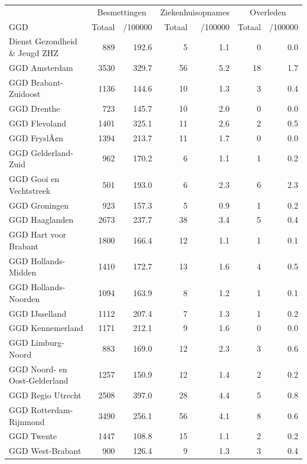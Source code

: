 \documentclass[
  english,
  man,floatsintext]{apa6}
\begin{document}
\begin{table}
\centering\begingroup\fontsize{10}{12}\selectfont

\begin{threeparttable}
\begin{tabular}{lrrrrrr}
\toprule
\multicolumn{1}{c}{ } & \multicolumn{2}{c}{Besmettingen} & \multicolumn{2}{c}{Ziekenhuisopnames} & \multicolumn{2}{c}{Overleden} \\
\cmidrule(l{3pt}r{3pt}){2-3} \cmidrule(l{3pt}r{3pt}){4-5} \cmidrule(l{3pt}r{3pt}){6-7}
GGD & Totaal & /100000 & Totaal & /100000 & Totaal & /100000\\
\midrule
Dienst Gezondheid \& Jeugd ZHZ & 889 & 192.6 & 5 & 1.1 & 0 & 0.0\\
GGD Amsterdam & 3530 & 329.7 & 56 & 5.2 & 18 & 1.7\\
GGD Brabant-Zuidoost & 1136 & 144.6 & 10 & 1.3 & 3 & 0.4\\
GGD Drenthe & 723 & 145.7 & 10 & 2.0 & 0 & 0.0\\
GGD Flevoland & 1401 & 325.1 & 11 & 2.6 & 2 & 0.5\\
GGD FryslÃ¢n & 1394 & 213.7 & 11 & 1.7 & 0 & 0.0\\
GGD Gelderland-Zuid & 962 & 170.2 & 6 & 1.1 & 1 & 0.2\\
GGD Gooi en Vechtstreek & 501 & 193.0 & 6 & 2.3 & 6 & 2.3\\
GGD Groningen & 923 & 157.3 & 5 & 0.9 & 1 & 0.2\\
GGD Haaglanden & 2673 & 237.7 & 38 & 3.4 & 5 & 0.4\\
GGD Hart voor Brabant & 1800 & 166.4 & 12 & 1.1 & 1 & 0.1\\
GGD Hollands-Midden & 1410 & 172.7 & 13 & 1.6 & 4 & 0.5\\
GGD Hollands-Noorden & 1094 & 163.9 & 8 & 1.2 & 1 & 0.1\\
GGD IJsselland & 1112 & 207.4 & 7 & 1.3 & 1 & 0.2\\
GGD Kennemerland & 1171 & 212.1 & 9 & 1.6 & 0 & 0.0\\
GGD Limburg-Noord & 883 & 169.0 & 12 & 2.3 & 3 & 0.6\\
GGD Noord- en Oost-Gelderland & 1257 & 150.9 & 12 & 1.4 & 2 & 0.2\\
GGD Regio Utrecht & 2508 & 397.0 & 28 & 4.4 & 5 & 0.8\\
GGD Rotterdam-Rijnmond & 3490 & 256.1 & 56 & 4.1 & 8 & 0.6\\
GGD Twente & 1447 & 108.8 & 15 & 1.1 & 2 & 0.2\\
GGD West-Brabant & 900 & 126.4 & 9 & 1.3 & 3 & 0.4\\

\end{tabular}
\end{threeparttable}
\end{table}
\end{document}
